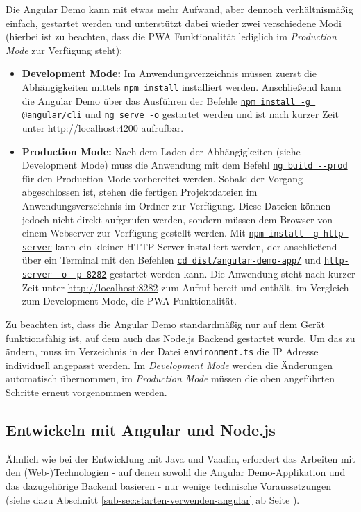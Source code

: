 \documentclass[a4paper,12pt,twoside]{scrreprt}
\begin{document}
Die Angular Demo kann mit etwas mehr Aufwand, aber dennoch verhältnismäßig einfach, gestartet werden und unterstützt dabei wieder zwei verschiedene Modi (hierbei ist zu beachten, dass die \ac{PWA} Funktionalität lediglich im \textit{Production Mode} zur Verfügung steht):

\begin{itemize}
    \item \textbf{Development Mode:} Im Anwendungsverzeichnis  müssen zuerst die Abhängigkeiten mittels \underline{\texttt{npm install}} installiert werden. Anschließend kann die Angular Demo über das Ausführen der Befehle \underline{\texttt{npm install -g @angular/cli}} und \underline{\texttt{ng serve -o}} gestartet werden und ist nach kurzer Zeit unter \url{http://localhost:4200} aufrufbar.
    \item \textbf{Production Mode:} Nach dem Laden der Abhängigkeiten (siehe Development Mode) muss die Anwendung mit dem Befehl \underline{\texttt{ng build -{}-prod}} für den Production Mode vorbereitet werden. Sobald der Vorgang abgeschlossen ist, stehen die fertigen Projektdateien im Anwendungsverzeichnis im Ordner  zur Verfügung. \newline
    Diese Dateien können jedoch nicht direkt aufgerufen werden, sondern müssen dem Browser von einem Webserver zur Verfügung gestellt werden. Mit \underline{\texttt{npm install -g http-server}} kann ein kleiner HTTP-Server installiert werden, der anschließend über ein Terminal mit den Befehlen \underline{\texttt{cd dist/angular-demo-app/}} und \underline{\texttt{http-server -o -p 8282}} gestartet werden kann. Die Anwendung steht nach kurzer Zeit unter \url{http://localhost:8282} zum Aufruf bereit und enthält, im Vergleich zum Development Mode, die \ac{PWA} Funktionalität.
\end{itemize}

Zu beachten ist, dass die Angular Demo standardmäßig nur auf dem Gerät funktionsfähig ist, auf dem auch das Node.js Backend gestartet wurde. Um das zu ändern, muss im Verzeichnis  in der Datei \texttt{environment.ts} die IP Adresse individuell angepasst werden. Im \textit{Development Mode} werden die Änderungen automatisch übernommen, im \textit{Production Mode} müssen die oben angeführten Schritte erneut vorgenommen werden.

\subsection{Entwickeln mit Angular und Node.js}
\label{sub-sec:entwickeln-angular}
Ähnlich wie bei der Entwicklung mit Java und Vaadin, erfordert das Arbeiten mit den (Web-)Technologien - auf denen sowohl die Angular Demo-Applikation und das dazugehörige Backend basieren - nur wenige technische Voraussetzungen (siehe dazu Abschnitt \ref{sub-sec:starten-verwenden-angular} ab Seite \pageref{sub-sec:starten-verwenden-angular}).
\end{document}
